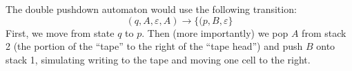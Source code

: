 \documentclass{article}
\begin{document}
\section{} %
\subsection{} %
\begin{minipage}{\textwidth}

\end{minipage}
\subsection{} %
The double pushdown automaton would use the following transition:
\[(q,A,\varepsilon,A)\rightarrow\{(p,B,\varepsilon\}\]
First, we move from state $q$ to $p$. Then (more importantly) we pop $A$ from
stack 2 (the portion of the ``tape'' to the right of the ``tape head'') and
push $B$ onto stack 1, simulating writing to the tape and moving one cell
to the right.
\end{document}
